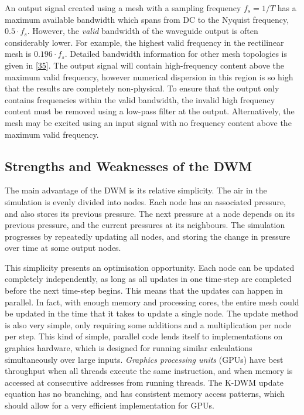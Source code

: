 \documentclass[]{scrreprt}
\begin{document}
An output signal created using a mesh with a sampling frequency
\(f_s = 1/T\) has a maximum available bandwidth which spans from DC to
the Nyquist frequency, \(0.5 \cdot f_s\). However, the \emph{valid}
bandwidth of the waveguide output is often considerably lower. For
example, the highest valid frequency in the rectilinear mesh is
\(0.196 \cdot f_s\). Detailed bandwidth information for other mesh
topologies is given in
{[}\protect\hyperlink{ref-kowalczykux5froomux5f2011}{35}{]}. The output
signal will contain high-frequency content above the maximum valid
frequency, however numerical dispersion in this region is so high that
the results are completely non-physical. To ensure that the output only
contains frequencies within the valid bandwidth, the invalid high
frequency content must be removed using a low-pass filter at the output.
Alternatively, the mesh may be excited using an input signal with no
frequency content above the maximum valid frequency.

\subsection{Strengths and Weaknesses of the
DWM}\label{strengths-and-weaknesses-of-the-dwm}

The main advantage of the DWM is its relative simplicity. The air in the
simulation is evenly divided into nodes. Each node has an associated
pressure, and also stores its previous pressure. The next pressure at a
node depends on its previous pressure, and the current pressures at its
neighbours. The simulation progresses by repeatedly updating all nodes,
and storing the change in pressure over time at some output nodes.

This simplicity presents an optimisation opportunity. Each node can be
updated completely independently, as long as all updates in one
time-step are completed before the next time-step begins. This means
that the updates can happen in parallel. In fact, with enough memory and
processing cores, the entire mesh could be updated in the time that it
takes to update a single node. The update method is also very simple,
only requiring some additions and a multiplication per node per step.
This kind of simple, parallel code lends itself to implementations on
graphics hardware, which is designed for running similar calculations
simultaneously over large inputs. \emph{Graphics processing units}
(GPUs) have best throughput when all threads execute the same
instruction, and when memory is accessed at consecutive addresses from
running threads. The K-DWM update equation has no branching, and has
consistent memory access patterns, which should allow for a very
efficient implementation for GPUs.
\end{document}
